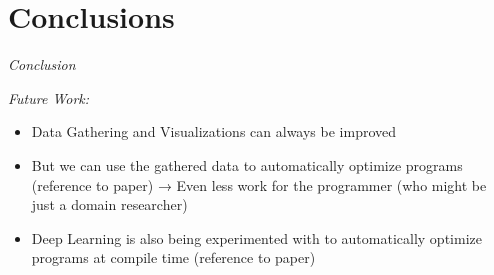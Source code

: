 \section{Conclusions}
\textit{Conclusion}

\textit{Future Work:}
\begin{itemize}
	\item Data Gathering and Visualizations can always be improved
	\item But we can use the gathered data to automatically optimize programs (reference to paper) → Even less work for the programmer (who might be just a domain researcher)
	\item Deep Learning is also being experimented with to automatically optimize programs at compile time (reference to paper)
\end{itemize}
